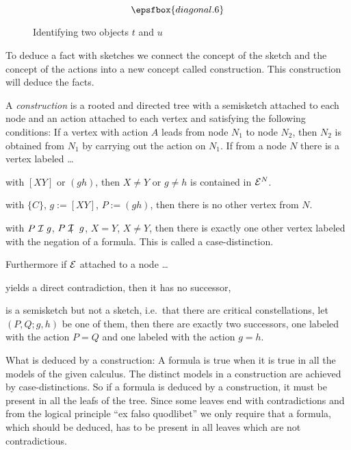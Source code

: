 \begin{figure}[ht]
  \[\epsfbox{diagonal.6}\]
  \caption{Identifying two objects $t$ and $u$}
  \label{skizze:gleichsetzen}
\end{figure}

To deduce a fact with sketches we connect the concept of the sketch
and the concept of the actions into a new concept called
construction. This construction will deduce the facts.


\begin{definition}[Construction] A \emph{construction} is a rooted and
directed 
tree with a semisketch attached to each node and an action
attached to each vertex and satisfying the following conditions:
If a vertex with action $A$ leads from node $N_1$ to node $N_2$, then $N_2$
is obtained from $N_1$ by carrying out the action on $N_1$. If from a
node $N$ there is a vertex labeled \ldots
\begin{compactitem}
  \item with $[XY]$ or $(gh)$, then $X\not=Y$ or $g\not=h$ is contained
  in $\cE^N$.
  \item with $\{C\}$, $g:=[XY]$, $P:=(gh)$, then there is no other
  vertex from $N$.
  \item with $P\cI g$, $P\notcI g$, $X=Y$, $X\not=Y$, then there is
  exactly one other vertex labeled with the negation of a
  formula. This is called a case-distinction. 
\end{compactitem}
\noindent Furthermore if $\cE$ attached to a node \ldots 
\begin{compactitem}
\item yields a direct contradiction, then it has no successor,
\item is a semisketch but not a sketch, i.e.\ that there are critical
constellations, let $(P,Q;g,h)$ be one of them, then there are exactly
two successors, one labeled with the action $P=Q$ and one labeled
with the action $g=h$.
\end{compactitem}
\end{definition}


What is deduced by a construction: A formula is true when it is true
in all the models of the given calculus. The distinct models in a
construction are achieved by case-distinctions. So if a formula 
is deduced by a construction, it must be present in all the leafs of
the tree. Since some leaves end with contradictions and from the
logical principle ``ex falso quodlibet'' we only require that a
formula, which should be deduced, has to be present in all leaves
which are not contradictious. 

